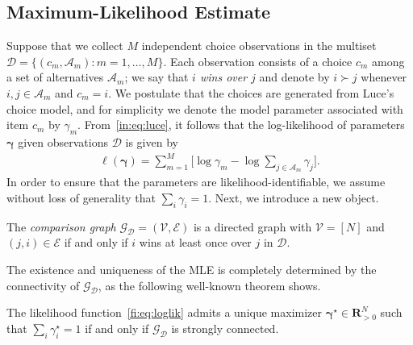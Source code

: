 \subsection{Maximum-Likelihood Estimate}
\label{fi:sec:mle}


Suppose that we collect $M$ independent choice observations in the multiset $\mathcal{D} = \{(c_m, \mathcal{A}_m) : m = 1, \ldots, M\}$.
Each observation consists of a choice $c_m$ among a set of alternatives $\mathcal{A}_m$;
we say that \emph{$i$ wins over $j$} and denote by $i \succ j$ whenever $i, j \in \mathcal{A}_m$ and $c_m = i$.
We postulate that the choices are generated from Luce's choice model, and for simplicity we denote the model parameter associated with item $c_m$ by $\gamma_m$.
From~\eqref{in:eq:luce}, it follows that the log-likelihood of parameters $\bm{\gamma}$ given observations $\mathcal{D}$ is given by
\begin{align}
\label{fi:eq:loglik}
\ell(\bm{\gamma}) = \sum_{m = 1}^M \bigg[ \log \gamma_m - \log{\sum_{j \in \mathcal{A}_m} \gamma_j} \bigg].
\end{align}
In order to ensure that the parameters are likelihood-identifiable, we assume without loss of generality that $\sum_i \gamma_i = 1$.
Next, we introduce a new object.

\begin{definition}
The \emph{comparison graph} $\mathcal{G}_{\mathcal{D}} = (\mathcal{V}, \mathcal{E})$ is a directed graph with $\mathcal{V} = [N]$ and $(j, i) \in \mathcal{E}$ if and only if $i$ wins at least once over $j$ in $\mathcal{D}$.
\end{definition}

The existence and uniqueness of the MLE is completely determined by the connectivity of $\mathcal{G}_{\mathcal{D}}$, as the following well-known theorem shows.

\begin{theorem}
\label{fi:thm:mlboth}
The likelihood function~\eqref{fi:eq:loglik} admits a unique maximizer $\bm{\gamma}^\star \in \mathbf{R}^N_{>0}$ such that $\sum_i \gamma^\star_i = 1$ if and only if $\mathcal{G}_{\mathcal{D}}$ is strongly connected.
\end{theorem}

